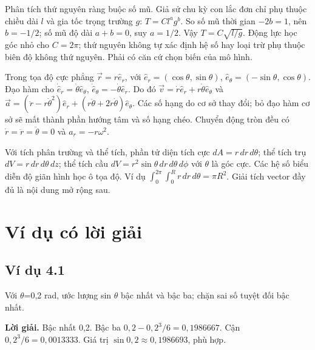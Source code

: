 \documentclass[11pt,a4paper,openany]{book}
\begin{document}
Phân tích thứ nguyên ràng buộc số mũ. Giả sử chu kỳ con lắc đơn chỉ phụ thuộc chiều dài $l$ và gia tốc trọng trường $g$: $T=C l^a g^b$. So số mũ thời gian $-2b=1$, nên $b=-1/2$; số mũ độ dài $a+b=0$, suy $a=1/2$. Vậy $T=C\sqrt{l/g}$. Động lực học góc nhỏ cho $C=2\pi$; thứ nguyên không tự xác định hệ số hay loại trừ phụ thuộc biên độ không thứ nguyên. Phải có căn cứ chọn biến của mô hình.

Trong tọa độ cực phẳng $\vec r=r\hat e_r$, với $\hat e_r=(\cos\theta,\sin\theta)$, $\hat e_\theta=(-\sin\theta,\cos\theta)$. Đạo hàm cho $\dot{\hat e}_r=\dot\theta\hat e_\theta$, $\dot{\hat e}_\theta=-\dot\theta\hat e_r$. Do đó $\vec v=\dot r\hat e_r+r\dot\theta\hat e_\theta$ và $\vec a=(\ddot r-r\dot\theta^2)\hat e_r+(r\ddot\theta+2\dot r\dot\theta)\hat e_\theta$. Các số hạng do cơ sở thay đổi; bỏ đạo hàm cơ sở sẽ mất thành phần hướng tâm và số hạng chéo. Chuyển động tròn đều có $\dot r=\ddot r=\ddot\theta=0$ và $a_r=-r\omega^2$.

Với tích phân trường và thể tích, phần tử diện tích cực $dA=r\,dr\,d\theta$; thể tích trụ $dV=r\,dr\,d\theta\,dz$; thể tích cầu $dV=r^2\sin\theta\,dr\,d\theta\,d\phi$ với $\theta$ là góc cực. Các hệ số biểu diễn độ giãn hình học ô tọa độ. Ví dụ $\int_0^{2\pi}\int_0^R r\,dr\,d\theta=\pi R^2$. Giải tích vector đầy đủ là nội dung mở rộng sau.
\begin{center}
\end{center}
\section{Ví dụ có lời giải}
\subsection*{Ví dụ 4.1}
Với \ensuremath{\theta}=0,2 rad, ước lượng sin \ensuremath{\theta} bậc nhất và bậc ba; chặn sai số tuyệt đối bậc nhất.

\textbf{Lời giải.} Bậc nhất 0,2. Bậc ba $0{,}2-0{,}2^3/6=0{,}1986667$. Cận $0{,}2^3/6=0{,}0013333$. Giá trị $\sin0{,}2\approx0{,}1986693$, phù hợp.
\end{document}
